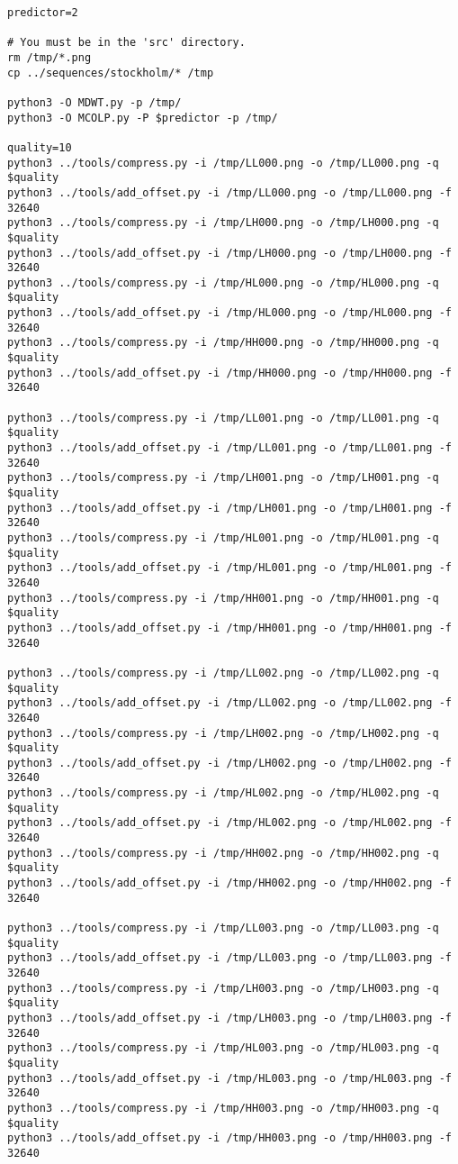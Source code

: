 \begin{verbatim}
predictor=2

# You must be in the 'src' directory.
rm /tmp/*.png
cp ../sequences/stockholm/* /tmp

python3 -O MDWT.py -p /tmp/
python3 -O MCOLP.py -P $predictor -p /tmp/

quality=10
python3 ../tools/compress.py -i /tmp/LL000.png -o /tmp/LL000.png -q $quality
python3 ../tools/add_offset.py -i /tmp/LL000.png -o /tmp/LL000.png -f 32640
python3 ../tools/compress.py -i /tmp/LH000.png -o /tmp/LH000.png -q $quality
python3 ../tools/add_offset.py -i /tmp/LH000.png -o /tmp/LH000.png -f 32640
python3 ../tools/compress.py -i /tmp/HL000.png -o /tmp/HL000.png -q $quality
python3 ../tools/add_offset.py -i /tmp/HL000.png -o /tmp/HL000.png -f 32640
python3 ../tools/compress.py -i /tmp/HH000.png -o /tmp/HH000.png -q $quality
python3 ../tools/add_offset.py -i /tmp/HH000.png -o /tmp/HH000.png -f 32640

python3 ../tools/compress.py -i /tmp/LL001.png -o /tmp/LL001.png -q $quality
python3 ../tools/add_offset.py -i /tmp/LL001.png -o /tmp/LL001.png -f 32640
python3 ../tools/compress.py -i /tmp/LH001.png -o /tmp/LH001.png -q $quality
python3 ../tools/add_offset.py -i /tmp/LH001.png -o /tmp/LH001.png -f 32640
python3 ../tools/compress.py -i /tmp/HL001.png -o /tmp/HL001.png -q $quality
python3 ../tools/add_offset.py -i /tmp/HL001.png -o /tmp/HL001.png -f 32640
python3 ../tools/compress.py -i /tmp/HH001.png -o /tmp/HH001.png -q $quality
python3 ../tools/add_offset.py -i /tmp/HH001.png -o /tmp/HH001.png -f 32640

python3 ../tools/compress.py -i /tmp/LL002.png -o /tmp/LL002.png -q $quality
python3 ../tools/add_offset.py -i /tmp/LL002.png -o /tmp/LL002.png -f 32640
python3 ../tools/compress.py -i /tmp/LH002.png -o /tmp/LH002.png -q $quality
python3 ../tools/add_offset.py -i /tmp/LH002.png -o /tmp/LH002.png -f 32640
python3 ../tools/compress.py -i /tmp/HL002.png -o /tmp/HL002.png -q $quality
python3 ../tools/add_offset.py -i /tmp/HL002.png -o /tmp/HL002.png -f 32640
python3 ../tools/compress.py -i /tmp/HH002.png -o /tmp/HH002.png -q $quality
python3 ../tools/add_offset.py -i /tmp/HH002.png -o /tmp/HH002.png -f 32640

python3 ../tools/compress.py -i /tmp/LL003.png -o /tmp/LL003.png -q $quality
python3 ../tools/add_offset.py -i /tmp/LL003.png -o /tmp/LL003.png -f 32640
python3 ../tools/compress.py -i /tmp/LH003.png -o /tmp/LH003.png -q $quality
python3 ../tools/add_offset.py -i /tmp/LH003.png -o /tmp/LH003.png -f 32640
python3 ../tools/compress.py -i /tmp/HL003.png -o /tmp/HL003.png -q $quality
python3 ../tools/add_offset.py -i /tmp/HL003.png -o /tmp/HL003.png -f 32640
python3 ../tools/compress.py -i /tmp/HH003.png -o /tmp/HH003.png -q $quality
python3 ../tools/add_offset.py -i /tmp/HH003.png -o /tmp/HH003.png -f 32640


\end{verbatim}
